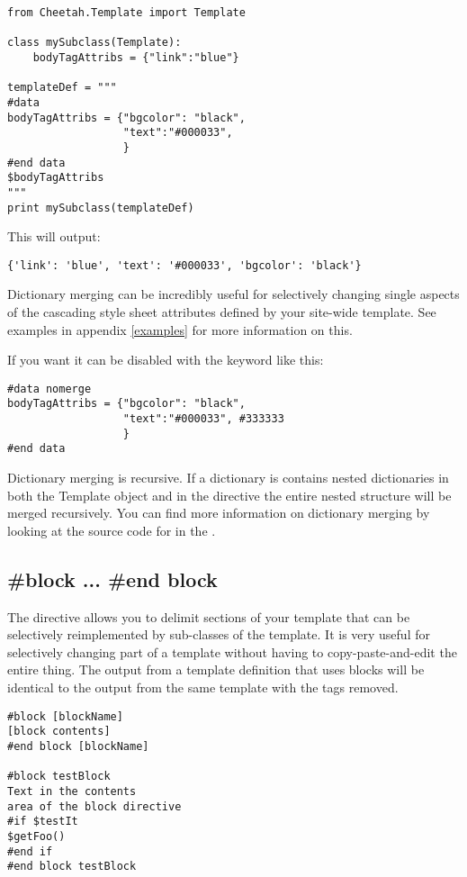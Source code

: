 \begin{verbatim}
from Cheetah.Template import Template

class mySubclass(Template):
    bodyTagAttribs = {"link":"blue"}

templateDef = """
#data 
bodyTagAttribs = {"bgcolor": "black",
                  "text":"#000033", 
                  }
#end data
$bodyTagAttribs
"""
print mySubclass(templateDef)
\end{verbatim}

This will output:
\begin{verbatim}
{'link': 'blue', 'text': '#000033', 'bgcolor': 'black'} 
\end{verbatim}

Dictionary merging can be incredibly useful for selectively changing single
aspects of the cascading style sheet attributes defined by your site-wide
template.  See examples in appendix \ref{examples} for more information on this.

If you want it can be disabled with the  keyword like this:
\begin{verbatim}
#data nomerge
bodyTagAttribs = {"bgcolor": "black",
                  "text":"#000033", #333333
                  }
#end data
\end{verbatim}

Dictionary merging is recursive.  If a dictionary is contains nested
dictionaries in both the Template object and in the  directive the
entire nested structure will be merged recursively.  You can find more
information on dictionary merging by looking at the source code for
 in the .


\subsection{\#block ... \#end block}
\label{directives.block}

The  directive allows you to delimit sections of your template
that can be selectively reimplemented by sub-classes of the template.  It is
very useful for selectively changing part of a template without having to
copy-paste-and-edit the entire thing.  The output from a template definition
that uses blocks will be identical to the output from the same template with the 
 tags removed. 

\begin{verbatim}
#block [blockName] 
[block contents] 
#end block [blockName]

#block testBlock
Text in the contents 
area of the block directive
#if $testIt
$getFoo() 
#end if
#end block testBlock
\end{verbatim}

